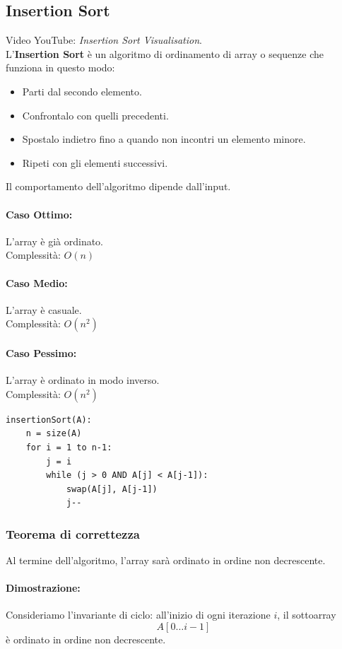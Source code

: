 \documentclass[a4paper,12pt]{article}
\begin{document}
\subsection{Insertion Sort}
Video YouTube: \textit{Insertion Sort Visualisation}.\\
L'\textbf{Insertion Sort} è un algoritmo di ordinamento di array o sequenze che funziona in questo modo:
\begin{itemize}
  \item Parti dal secondo elemento.
  \item Confrontalo con quelli precedenti.
  \item Spostalo indietro fino a quando non incontri un elemento minore.
  \item Ripeti con gli elementi successivi.
\end{itemize}
Il comportamento dell'algoritmo dipende dall'input.

\paragraph{Caso Ottimo:} L'array è già ordinato.\\
Complessità: $O(n)$

\paragraph{Caso Medio:} L'array è casuale.\\
Complessità: $O(n^2)$

\paragraph{Caso Pessimo:} L'array è ordinato in modo inverso.\\
Complessità: $O(n^2)$

\begin{lstlisting}
insertionSort(A):
    n = size(A)
    for i = 1 to n-1:
        j = i
        while (j > 0 AND A[j] < A[j-1]):
            swap(A[j], A[j-1])
            j--
\end{lstlisting}
\subsubsection{Teorema di correttezza}
Al termine dell'algoritmo, l'array sarà ordinato in ordine non decrescente.
\paragraph{Dimostrazione:}
Consideriamo l'invariante di ciclo: all'inizio di ogni iterazione $i$, il sottoarray
\[
A[0 \ldots i-1]
\]
è ordinato in ordine non decrescente.
\end{document}

